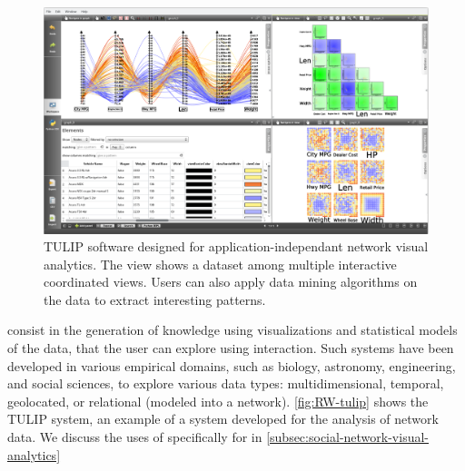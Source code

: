 \begin{figure}
    \centering %
    \includegraphics[width=1\textwidth]{static/figures/RelatedWork/TULIP}
    \caption{TULIP software designed for application-independant network visual analytics\cite{auberTULIP2017}. The view shows a dataset among multiple interactive coordinated views. Users can also apply data mining algorithms on the data to extract interesting patterns.}
    \label{fig:RW-tulip}
\end{figure}

\va consist in the generation of knowledge using visualizations and statistical models of the data, that the user can explore using interaction.
Such systems have been developed in various empirical domains, such as biology, astronomy, engineering, and social sciences, to explore various data types: multidimensional, temporal, geolocated, or relational (\ie modeled into a network).
\autoref{fig:RW-tulip} shows the TULIP system, an example of a \va system developed for the analysis of network data.
We discuss the uses of \va specifically for \hsna in \autoref{subsec:social-network-visual-analytics}




